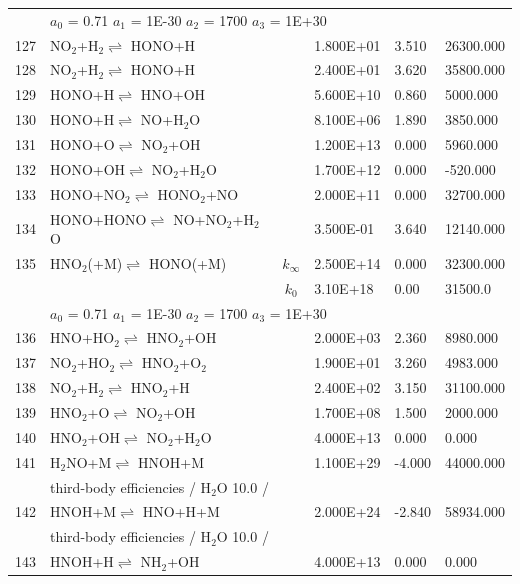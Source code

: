 \documentclass[11pt]{article}
\begin{document}
\begin{table}[hbt]
\begin{tabular}{|r l c l l l|}
	&\multicolumn{5}{l|}{	$a_0$ = 0.71	$a_1$ = 1E-30	$a_2$ = 1700	$a_3$ = 1E+30}\\ 
127 &	NO$_{2}$+H$_{2}$$\rightleftharpoons$ HONO+H&	&	1.800E+01&	3.510&	26300.000\\ 
128 &	NO$_{2}$+H$_{2}$$\rightleftharpoons$ HONO+H&	&	2.400E+01&	3.620&	35800.000\\ 
129 &	HONO+H$\rightleftharpoons$ HNO+OH&	&	5.600E+10&	0.860&	5000.000\\ 
130 &	HONO+H$\rightleftharpoons$ NO+H$_{2}$O&	&	8.100E+06&	1.890&	3850.000\\ 
131 &	HONO+O$\rightleftharpoons$ NO$_{2}$+OH&	&	1.200E+13&	0.000&	5960.000\\ 
132 &	HONO+OH$\rightleftharpoons$ NO$_{2}$+H$_{2}$O&	&	1.700E+12&	0.000&	-520.000\\ 
133 &	HONO+NO$_{2}$$\rightleftharpoons$ HONO$_{2}$+NO&	&	2.000E+11&	0.000&	32700.000\\ 
134 &	HONO+HONO$\rightleftharpoons$ NO+NO$_{2}$+H$_{2}$O&	&	3.500E-01&	3.640&	12140.000\\ 
135 &	HNO$_{2}$(+M)$\rightleftharpoons$ HONO(+M)&	$k_{\infty}$&	2.500E+14&	0.000&	32300.000\\ 
	&	&	$k_0$&	3.10E+18& 0.00&	31500.0\\ 
	&\multicolumn{5}{l|}{	$a_0$ = 0.71	$a_1$ = 1E-30	$a_2$ = 1700	$a_3$ = 1E+30}\\ 
136 &	HNO+HO$_{2}$$\rightleftharpoons$ HNO$_{2}$+OH&	&	2.000E+03&	2.360&	8980.000\\ 
137 &	NO$_{2}$+HO$_{2}$$\rightleftharpoons$ HNO$_{2}$+O$_{2}$&	&	1.900E+01&	3.260&	4983.000\\ 
138 &	NO$_{2}$+H$_{2}$$\rightleftharpoons$ HNO$_{2}$+H&	&	2.400E+02&	3.150&	31100.000\\ 
139 &	HNO$_{2}$+O$\rightleftharpoons$ NO$_{2}$+OH&	&	1.700E+08&	1.500&	2000.000\\ 
140 &	HNO$_{2}$+OH$\rightleftharpoons$ NO$_{2}$+H$_{2}$O&	&	4.000E+13&	0.000&	0.000\\ 
141 &	H$_{2}$NO+M$\rightleftharpoons$ HNOH+M&	&	1.100E+29&	-4.000&	44000.000\\ 
	&\multicolumn{5}{l|}{third-body efficiencies  / H$_{2}$O 10.0 /}\\ 
142 &	HNOH+M$\rightleftharpoons$ HNO+H+M&	&	2.000E+24&	-2.840&	58934.000\\ 
	&\multicolumn{5}{l|}{third-body efficiencies  / H$_{2}$O 10.0 /}\\ 
143 &	HNOH+H$\rightleftharpoons$ NH$_{2}$+OH&	&	4.000E+13&	0.000&	0.000\\ 

\end{tabular}
\end{table}
\end{document}
